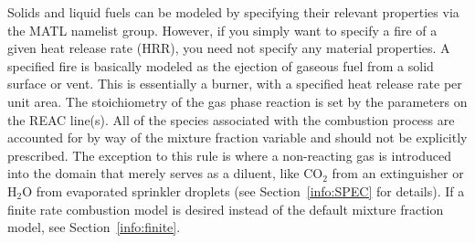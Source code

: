 \documentclass[11pt]{book}
\begin{document}
Solids and liquid fuels can be modeled by specifying their relevant
properties via the {\ct MATL} namelist group. However, if you simply
want to specify a fire of a given heat release rate (HRR),
you need not specify any material properties. A specified fire is
basically modeled as the ejection of gaseous fuel
from a solid surface or vent. This is essentially a burner, with a
specified heat release rate per unit area.
The stoichiometry of the gas phase reaction is set by the
parameters on the {\ct REAC} line(s). All of the
species associated with the combustion process are accounted for
by way of the mixture fraction variable and should not be
explicitly prescribed. The exception to this rule is
where a non-reacting gas is introduced into the domain that merely serves
as a diluent, like CO$_2$ from an extinguisher or H$_2$O from evaporated
sprinkler droplets (see Section~\ref{info:SPEC} for details).
If a finite rate combustion model is desired instead of the default mixture
fraction model, see Section~\ref{info:finite}.
\end{document}
